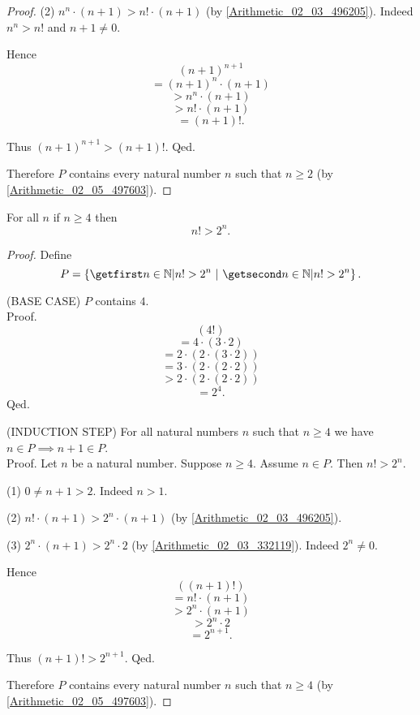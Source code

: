 \documentclass[../../arithmetic.tex]{subfiles}
\begin{document}
\begin{forthel}
\begin{proof}
        (2) $n^{n} \cdot (n + 1) > n! \cdot (n + 1)$ (by \ref{Arithmetic_02_03_496205}).
        Indeed $n^{n} > n!$ and $n + 1 \neq 0$.

        Hence
        \[   (n + 1)^{n + 1} \]
        \[ = (n + 1)^{n} \cdot (n + 1) \]
        \[ > n^{n} \cdot (n + 1) \]
        \[ > n! \cdot (n + 1) \]
        \[ = (n + 1)!. \]

        Thus $(n + 1)^{n + 1} > (n + 1)!$.
      Qed.

      Therefore $P$ contains every natural number $n$ such that $n \geq 2$ (by \ref{Arithmetic_02_05_497603}).
    \end{proof}


    \begin{proposition}\label{Arithmetic_02_06_493411}
      For all $n$ if $n \geq 4$ then \[ n! > 2^{n}. \]
    \end{proposition}
    \begin{proof}
      Define \[ P = \class{n \in \Nat | n! > 2^{n}}. \]

      (BASE CASE) $P$ contains $4$. \\
      Proof.
        \[   (4!) \]
        \[ = 4 \cdot (3 \cdot 2) \]
        \[ = 2 \cdot (2 \cdot (3 \cdot 2)) \]
        \[ = 3 \cdot (2 \cdot (2 \cdot 2)) \]
        \[ > 2 \cdot (2 \cdot (2 \cdot 2)) \]
        \[ = 2^{4}. \]
      Qed.

      (INDUCTION STEP) For all natural numbers $n$ such that $n \geq 4$ we have $n \in P \implies n + 1 \in P$. \\
      Proof.
        Let $n$ be a natural number.
        Suppose $n \geq 4$.
        Assume $n \in P$.
        Then $n! > 2^{n}$.

        (1) $0 \neq n + 1 > 2$.
        Indeed $n > 1$.

        (2) $n! \cdot (n + 1) > 2^{n} \cdot (n + 1)$ (by \ref{Arithmetic_02_03_496205}).

        (3) $2^{n} \cdot (n + 1) > 2^{n} \cdot 2$ (by \ref{Arithmetic_02_03_332119}).
        Indeed $2^{n} \neq 0$.

        Hence
        \[   ((n + 1)!) \]
        \[ = n! \cdot (n + 1) \]
        \[ > 2^{n} \cdot (n + 1) \]
        \[ > 2^{n} \cdot 2 \]
        \[ = 2^{n + 1}. \]

        Thus $(n + 1)! > 2^{n + 1}$.
      Qed.

      Therefore $P$ contains every natural number $n$ such that $n \geq 4$ (by \ref{Arithmetic_02_05_497603}).
    \end{proof}
  \end{forthel}
\end{document}
